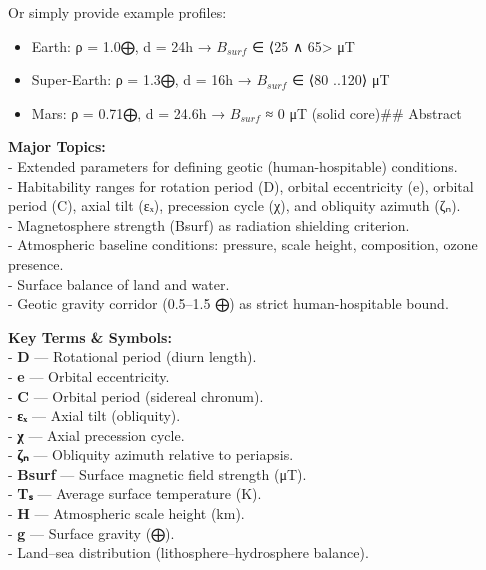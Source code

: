 \documentclass[
  letterpaper,
]{book}
\providecommand{\tightlist}{%
  \setlength{\itemsep}{0pt}\setlength{\parskip}{0pt}}
\begin{document}
Or simply provide example profiles:

\begin{itemize}
\tightlist
\item
  Earth: ρ = 1.0⨁, d = 24h → \(B_{surf}\) ∈ ⟨25 ∧ 65\textgreater{} μT\\
\item
  Super-Earth: ρ = 1.3⨁, d = 16h → \(B_{surf}\) ∈ ⟨80 ..120⟩ μT\\
\item
  Mars: ρ = 0.71⨁, d = 24.6h → \(B_{surf}\) ≈ 0 μT (solid core)\#\#
  Abstract
\end{itemize}

\textbf{Major Topics:}\\
- Extended parameters for defining geotic (human-hospitable)
conditions.\\
- Habitability ranges for rotation period (D), orbital eccentricity (e),
orbital period (C), axial tilt (εₓ), precession cycle (χ), and obliquity
azimuth (ζₙ).\\
- Magnetosphere strength (Bsurf) as radiation shielding criterion.\\
- Atmospheric baseline conditions: pressure, scale height, composition,
ozone presence.\\
- Surface balance of land and water.\\
- Geotic gravity corridor (0.5--1.5 ⨁) as strict human-hospitable bound.

\textbf{Key Terms \& Symbols:}\\
- \textbf{D} --- Rotational period (diurn length).\\
- \textbf{e} --- Orbital eccentricity.\\
- \textbf{C} --- Orbital period (sidereal chronum).\\
- \textbf{εₓ} --- Axial tilt (obliquity).\\
- \textbf{χ} --- Axial precession cycle.\\
- \textbf{ζₙ} --- Obliquity azimuth relative to periapsis.\\
- \textbf{Bsurf} --- Surface magnetic field strength (μT).\\
- \textbf{Tₛ} --- Average surface temperature (K).\\
- \textbf{H} --- Atmospheric scale height (km).\\
- \textbf{g} --- Surface gravity (⨁).\\
- Land--sea distribution (lithosphere--hydrosphere balance).
\end{document}
